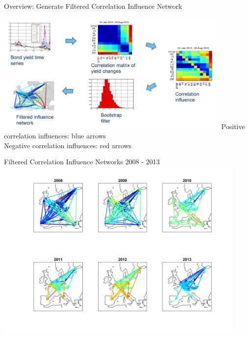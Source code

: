 \documentclass{beamer}
\begin{document}
\begin{frame}{Overview: Generate Filtered Correlation Influence Network}

\includegraphics[height=6cm]{scheme}
Positive correlation influences: {\color{blue} blue arrows}\\ 
Negative correlation influences: {\color{red} red arrows}

\end{frame}


\begin{frame}{Filtered Correlation Influence Networks 2008 - 2013}
\vspace{-0.0cm}\hspace*{-1cm}\includegraphics[height=9cm]{networks2008-2013}



\end{frame}
\end{document}
